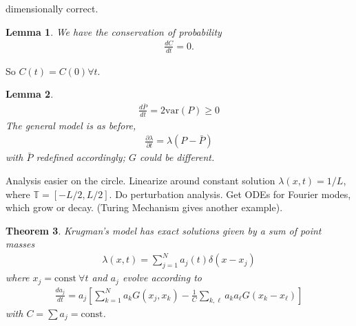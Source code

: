 \documentclass[12pt,reqno]{amsart}
\numberwithin{equation}{section}  %
\newcommand{\ci}{\mathbb{T}}
\newcommand{\p}{\partial}
\newtheorem{theorem}{Theorem}[section]
\newtheorem{lemma}[theorem]{Lemma}
\begin{document}
  dimensionally correct.
%
%
%
%
%
%
%
%
%
%
  \begin{lemma}
%
    We have the conservation of probability
%
    \begin{equation*}
      \begin{split}
	\frac{dC}{dt} =0.
      \end{split}
    \end{equation*}
%
%
    \label{lem:cons-prob}
  \end{lemma}
%
%
  So $C(t) = C(0) \forall t$. 
%
%
%
%
%
%
%                
%
%
%
%
  \begin{lemma}
%
%
    \begin{equation*}
      \begin{split}
	\frac{d \bar{P}}{dt} = 2 \text{var}(P) \ge 0
      \end{split}
    \end{equation*}
%
%
    The general model is as before, 
%
%
    \begin{equation*}
      \begin{split}
	\frac{\p \lambda}{\p t} = \lambda (P - \bar{P}) 
      \end{split}
    \end{equation*}
%
%
    with $\bar{P}$ redefined accordingly; $G$ could be different.
    \label{lem:deriv-barP}
  \end{lemma}
%
%
  Analysis easier on the circle. Linearize around constant solution
  $\lambda(x,t) = 1/L$, where $\ci = [-L/2, L/2]$. Do perturbation analysis.
  Get ODEs for Fourier modes, which grow or decay. (Turing Mechanism gives another
  example).
%
%
%
%
%
%
%
%
%
%
  \begin{theorem}
    Krugman's model has exact solutions given by a sum of point masses
%
%
    \begin{equation*}
      \begin{split}
	\lambda(x,t) = \sum_{j=1}^{N} a_{j}(t) \delta(x - x_{j})
      \end{split}
    \end{equation*}
%
%
    where $x_{j} = \text{const} \ \forall t$ and $a_{j}$ evolve according to 
%
%
    \begin{equation*}
      \begin{split}
	\frac{d a_{j}}{dt} = a_{j}\left[ \sum_{k=1}^{N} a_{k} G(x_{j}, x_{k}) -
	\frac{1}{C} \sum_{k, \ell} a_{k}a_{\ell} G(x_{k} - x_{\ell}) \right] 
      \end{split}
    \end{equation*}
%
%
    with $C = \sum a_{j} = \text{const}$.
    \label{thm:main-theorem}
  \end{theorem}
\end{document}
